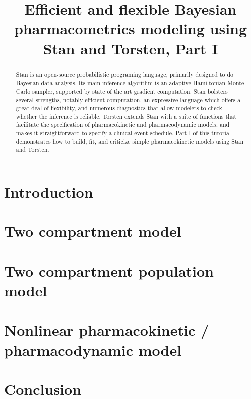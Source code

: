 \documentclass[11pt]{article}
\title{Efficient and flexible Bayesian pharmacometrics modeling using Stan and Torsten, Part I}
\author{}
\date{}
\begin{document}
\maketitle

\begin{abstract}
  Stan is an open-source probabilistic programing language, primarily designed to do Bayesian data analysis.
  Its main inference algorithm is an adaptive Hamiltonian Monte Carlo sampler, supported by state of the art gradient computation.
  Stan bolsters several strengths, notably efficient computation, an expressive language which offers a great deal of flexibility, and numerous diagnostics that allow modelers to check whether the inference is reliable.
  Torsten extends Stan with a suite of functions that facilitate the specification of pharmacokinetic and pharmacodynamic models, and makes it straightforward to specify a clinical event schedule.
  Part I of this tutorial demonstrates how to build, fit, and criticize simple pharmacokinetic models using Stan and Torsten.
\end{abstract}

\section{Introduction}


%

\section{Two compartment model}  \label{sec:twoCpt}


\section{Two compartment population model}


\section{Nonlinear pharmacokinetic / pharmacodynamic model}


\section{Conclusion}




\end{document}
